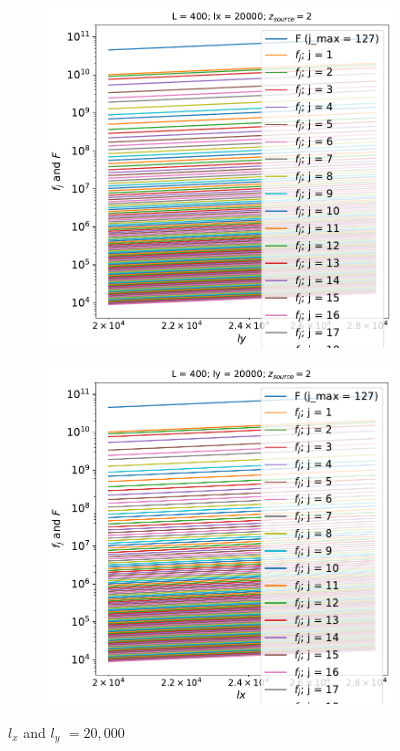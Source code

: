 \documentclass[12pt]{article}
\numberwithin{equation}{section}
\begin{document}
\begin{figure}
	\centering
	\begin{subfigure}{0.49\textwidth}
		\centering
		\includegraphics[width=\textwidth]{lx_20000_L_400}
		\caption{}
		\label{fig:21cm-powspec}
	\end{subfigure}
	\begin{subfigure}{0.49\textwidth}
		\centering
		\includegraphics[width=\textwidth]{ly_20000_L_400}
		\caption{}
		\label{fig:21cm-matter-powspec}
	\end{subfigure}
	\caption{$ l_x $ and $ l_y $ $ = 20,000 $}
\end{figure}
\end{document}
